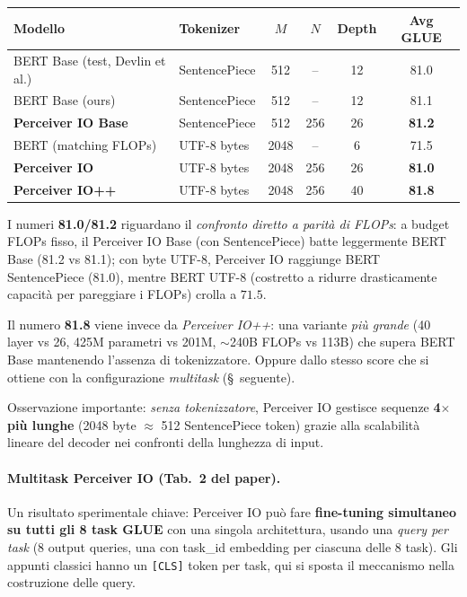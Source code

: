 \documentclass[
  11pt,
]{article}
\begin{document}
{\small
\begin{longtable}{@{}p{4.5cm} p{2.5cm} c c c c@{}}
\toprule
\textbf{Modello} & \textbf{Tokenizer} & \textbf{$M$} & \textbf{$N$} & \textbf{Depth} & \textbf{Avg GLUE} \\
\midrule
\endhead
BERT Base (test, Devlin et al.) & SentencePiece & 512 & -- & 12 & 81.0 \\[2pt]
BERT Base (ours) & SentencePiece & 512 & -- & 12 & 81.1 \\[2pt]
\textbf{Perceiver IO Base} & SentencePiece & 512 & 256 & 26 & \textbf{81.2} \\[2pt]
\midrule
BERT (matching FLOPs) & UTF-8 bytes & 2048 & -- & 6 & 71.5 \\[2pt]
\textbf{Perceiver IO} & UTF-8 bytes & 2048 & 256 & 26 & \textbf{81.0} \\[2pt]
\textbf{Perceiver IO++} & UTF-8 bytes & 2048 & 256 & 40 & \textbf{81.8} \\
\bottomrule
\end{longtable}
}

\begin{notabox}[title={\textbf{Perceiver IO su GLUE: due risultati, uno spesso confuso}}]
I numeri \textbf{81.0/81.2} riguardano il \emph{confronto diretto a parità di FLOPs}: a budget FLOPs fisso, il Perceiver IO Base (con SentencePiece) batte leggermente BERT Base (81.2 vs 81.1); con byte UTF-8, Perceiver IO raggiunge BERT SentencePiece ($81.0$), mentre BERT UTF-8 (costretto a ridurre drasticamente capacità per pareggiare i FLOPs) crolla a $71.5$.

Il numero \textbf{81.8} viene invece da \emph{Perceiver IO++}: una variante \emph{più grande} (40 layer vs 26, 425M parametri vs 201M, $\sim$240B FLOPs vs 113B) che supera BERT Base mantenendo l'assenza di tokenizzatore. Oppure dallo stesso score che si ottiene con la configurazione \emph{multitask} (\S~seguente).

Osservazione importante: \emph{senza tokenizzatore}, Perceiver IO gestisce sequenze \textbf{4$\times$ più lunghe} (2048 byte $\approx$ 512 SentencePiece token) grazie alla scalabilità lineare del decoder nei confronti della lunghezza di input.
\end{notabox}

\paragraph{Multitask Perceiver IO (Tab.\ 2 del paper).} Un risultato sperimentale chiave: Perceiver IO può fare \textbf{fine-tuning simultaneo su tutti gli 8 task GLUE} con una singola architettura, usando una \emph{query per task} (8 output queries, una con task\_id embedding per ciascuna delle 8 task). Gli appunti classici hanno un \texttt{[CLS]} token per task, qui si sposta il meccanismo nella costruzione delle query.
\end{document}
